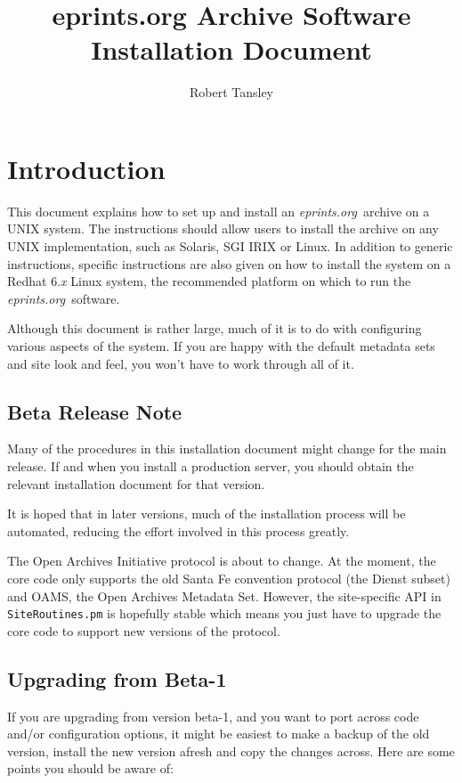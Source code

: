\documentclass[a4paper]{article}
\title{eprints.org Archive Software Installation Document}
\author{Robert Tansley}
\newcommand{\eprints}{\emph{eprints.org}}
\begin{document}
\maketitle

\section{Introduction}

This document explains how to set up and install an \eprints\ archive on a UNIX system. The instructions should allow users to install the archive on any UNIX implementation, such as Solaris, SGI IRIX or Linux. In addition to generic instructions, specific instructions are also given on how to install the system on a Redhat 6.\emph{x} Linux system, the recommended platform on which to run the \eprints\ software.

Although this document is rather large, much of it is to do with configuring various aspects of the system. If you are happy with the default metadata sets and site look and feel, you won't have to work through all of it.


\subsection{Beta Release Note}

Many of the procedures in this installation document might change for the main release. If and when you install a production server, you should obtain the relevant installation document for that version.

It is hoped that in later versions, much of the installation process will be automated, reducing the effort involved in this process greatly.

The Open Archives Initiative protocol is about to change. At the moment, the core code only supports the old Santa Fe convention protocol (the Dienst subset) and OAMS, the Open Archives Metadata Set. However, the site-specific API in {\tt SiteRoutines.pm} is hopefully stable which means you just have to upgrade the core code to support new versions of the protocol.


\subsection{Upgrading from Beta-1}

If you are upgrading from version beta-1, and you want to port across code and/or configuration options, it might be easiest to make a backup of the old version, install the new version afresh and copy the changes across. Here are some points you should be aware of:
\end{document}

